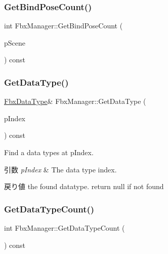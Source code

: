 \subsubsection{\texorpdfstring{Get\+Bind\+Pose\+Count()}{GetBindPoseCount()}}
{\footnotesize\ttfamily int Fbx\+Manager\+::\+Get\+Bind\+Pose\+Count (\begin{DoxyParamCaption}\item[{\hyperlink{class_fbx_scene}{Fbx\+Scene} $\ast$}]{p\+Scene }\end{DoxyParamCaption}) const}

\mbox{\label{class_fbx_manager_a714bbbf19e0bb8b488ffc34b689984e7}} 
\subsubsection{\texorpdfstring{Get\+Data\+Type()}{GetDataType()}}
{\footnotesize\ttfamily \hyperlink{class_fbx_data_type}{Fbx\+Data\+Type}\& Fbx\+Manager\+::\+Get\+Data\+Type (\begin{DoxyParamCaption}\item[{const int}]{p\+Index }\end{DoxyParamCaption}) const}

Find a data types at p\+Index. 
\begin{DoxyParams}{引数}
{\em p\+Index} & The data type index. \\
\hline
\end{DoxyParams}
\begin{DoxyReturn}{戻り値}
the found datatype. return null if not found 
\end{DoxyReturn}
\mbox{\label{class_fbx_manager_a1215bb7d42c38e3e9948564b04d3dc1b}} 
\subsubsection{\texorpdfstring{Get\+Data\+Type\+Count()}{GetDataTypeCount()}}
{\footnotesize\ttfamily int Fbx\+Manager\+::\+Get\+Data\+Type\+Count (\begin{DoxyParamCaption}{ }\end{DoxyParamCaption}) const}

